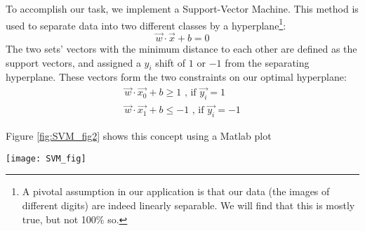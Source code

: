 %
%

To accomplish our task, we implement a Support-Vector Machine. This method is used to separate data into two different classes by a hyperplane\footnote{A pivotal assumption in our application is that our data (the images of different digits) are indeed linearly separable. We will find that this is mostly true, but not 100\% so.}:
\begin{equation}
\vec{w}\cdot\vec{x} + b = 0
\end{equation}
The two sets' vectors with the minimum distance to each other are defined as the support vectors, and assigned a $y_{i}$ shift of $1$ or $-1$ from the separating hyperplane. These vectors form the two constraints on our optimal hyperplane:
\begin{equation}
\begin{gathered}
	\vec{w}\cdot\vec{x_0} + b \geq 1 \text{ , if } \vec{y_i} = 1 \\
	\vec{w}\cdot\vec{x_1} + b \leq -1 \text{ , if } \vec{y_i} = -1 
\end{gathered}
\end{equation}

Figure \ref{fig:SVM_fig2} shows this concept using a Matlab plot

\begin{figure*}[!htb]
	\texttt{[image: SVM\_fig]}
	\centering
	\caption{The hyperplane is constrained to be within the limits of the margin, which are themselves defined by the support vectors.}
	\label{fig:SVM_fig2}
\end{figure*}

